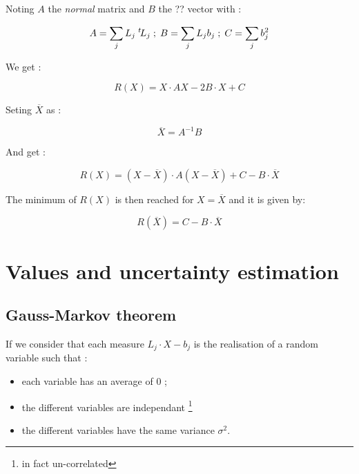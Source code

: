 Noting $A$ the \emph{normal} matrix and $B$ the ?? vector  with :

\begin{equation}
	A =   \sum_j L_j  \; ^{t} \! L_j  \; ; \;  B =\sum_j L_j b_j  \; ; \; C =  \sum_j b_j ^2
\end{equation}

We get :

\begin{equation}
	R(X) =  X \cdot A X - 2 B \cdot X +  C
\end{equation}


Seting $\overline X$ as :

\begin{equation}
	\overline X = A^{-1} B \label{LstSq:Sol}
\end{equation}

And get :

\begin{equation}
	R(X) =  (X-\overline X ) \cdot A  (X-\overline X )   +  C - B \cdot \overline X 
\end{equation}

The minimum of $R(X)$ is then reached for $X=\overline X$ and it is given by:

\begin{equation}
	R(\overline X) =    C - B \cdot \overline X \label{Lst:Res:Min}
\end{equation}



\section{Values and uncertainty estimation}

\subsection{Gauss-Markov theorem}
If we consider that each measure $L_j \cdot X - b_j$ is the realisation
of a random variable  such that :

\begin{itemize}
    \item each variable has an average of $0$ ;
    \item  the different variables are independant \footnote{in fact un-correlated}
    \item  the different variables have  the same variance $\sigma ^2$.
\end{itemize}

